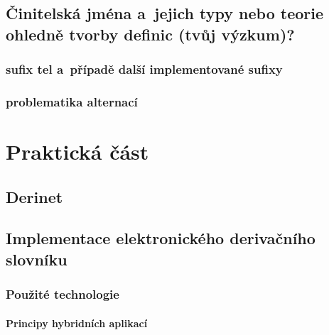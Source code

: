 \hypertarget{ux10dinitelskuxe1-jmuxe9na-a-jejich-typy-nebo-teorie-ohlednux11b-tvorby-definic-tvux16fj-vuxfdzkum}{%
\chapter{Činitelská jména a~jejich typy nebo teorie ohledně tvorby
definic (tvůj
výzkum)?}\label{ux10dinitelskuxe1-jmuxe9na-a-jejich-typy-nebo-teorie-ohlednux11b-tvorby-definic-tvux16fj-vuxfdzkum}}

\hypertarget{sufix-tel-a-pux159uxedpadux11b-dalux161uxed-implementovanuxe9-sufixy}{%
\section{sufix tel a~případě další implementované
sufixy}\label{sufix-tel-a-pux159uxedpadux11b-dalux161uxed-implementovanuxe9-sufixy}}

\hypertarget{problematika-alternacuxed}{%
\section{problematika alternací}\label{problematika-alternacuxed}}

\part{Praktická část}

\hypertarget{derinet}{%
\chapter{Derinet}\label{derinet}}

\hypertarget{implementace-elektronickuxe9ho-derivaux10dnuxedho-slovnuxedku}{%
\chapter{Implementace elektronického derivačního
slovníku}\label{implementace-elektronickuxe9ho-derivaux10dnuxedho-slovnuxedku}}

\hypertarget{pouux17eituxe9-technologie}{%
\section{Použité technologie}\label{pouux17eituxe9-technologie}}

\hypertarget{principy-hybridnuxedch-aplikacuxed}{%
\subsection{Principy hybridních
aplikací}\label{principy-hybridnuxedch-aplikacuxed}}

